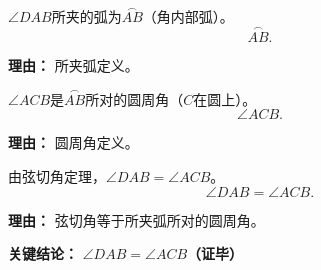 \begin{examplebox}
\begin{description}[style=nextline, leftmargin=2.8em, labelsep=0.5em, itemsep=0.45em]
		\item[\textbf{第二步（确定所夹弧）：}]
		      $\angle DAB$所夹的弧为$\overset{\frown}{AB}$（角内部弧）。
		      \[
			      \overset{\frown}{AB}.
		      \]
		      \par\textbf{理由：}
		      所夹弧定义。

		\item[\textbf{第三步（找圆周角）：}]
		      $\angle ACB$是$\overset{\frown}{AB}$所对的圆周角（$C$在圆上）。
		      \[
			      \angle ACB.
		      \]
		      \par\textbf{理由：}
		      圆周角定义。

		\item[\textbf{第四步（套定理）：}]
		      由弦切角定理，$\angle DAB = \angle ACB$。
		      \[
			      \angle DAB = \angle ACB.
		      \]
		      \par\textbf{理由：}
		      弦切角等于所夹弧所对的圆周角。
	\end{description}

	\textbf{\textcolor{CExample}{关键结论：}}
	\textbf{$\angle DAB = \angle ACB$（证毕）}
\end{examplebox}